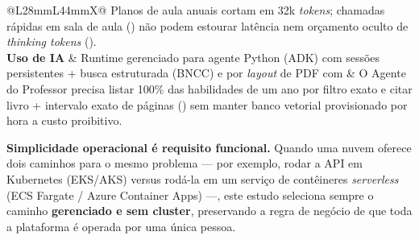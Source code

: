 \begin{table}[H]
\begin{tabularx}{\linewidth}{@{}L{28mm}L{44mm}X@{}}
  Planos de aula anuais cortam em 32k \emph{tokens}; chamadas rápidas em sala de
  aula () não podem estourar latência nem orçamento oculto de
  \emph{thinking tokens} ().\\
\textbf{Uso de IA} &
  Runtime gerenciado para agente Python (ADK) com sessões persistentes + busca
  estruturada (BNCC) e por \emph{layout} de PDF com  &
  O Agente do Professor precisa listar 100\% das habilidades de um ano por
  filtro exato e citar livro + intervalo exato de páginas () sem
  manter banco vetorial provisionado por hora a custo proibitivo.\\
\bottomrule
\end{tabularx}
\end{table}

\begin{regra}
\textbf{Simplicidade operacional é requisito funcional.} Quando uma nuvem oferece
dois caminhos para o mesmo problema --- por exemplo, rodar a API em Kubernetes
(EKS/AKS) versus rodá-la em um serviço de contêineres \emph{serverless} (ECS
Fargate / Azure Container Apps) ---, este estudo seleciona sempre o caminho
\textbf{gerenciado e sem cluster}, preservando a regra de negócio de que toda a
plataforma é operada por uma única pessoa.
\end{regra}
